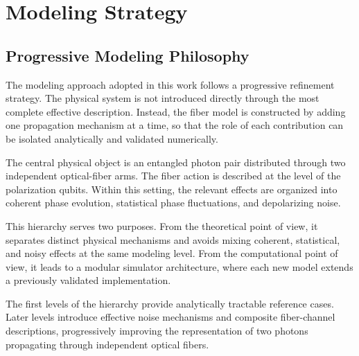 
\chapter{Modeling Strategy}


\section{Progressive Modeling Philosophy}

The modeling approach adopted in this work follows a progressive refinement strategy. The physical system is not introduced directly through the most complete effective description. Instead, the fiber model is constructed by adding one propagation mechanism at a time, so that the role of each contribution can be isolated analytically and validated numerically.

\medskip

The central physical object is an entangled photon pair distributed through two independent optical-fiber arms. The fiber action is described at the level of the polarization qubits. Within this setting, the relevant effects are organized into coherent phase evolution, statistical phase fluctuations, and depolarizing noise.

\medskip

This hierarchy serves two purposes. From the theoretical point of view, it separates distinct physical mechanisms and avoids mixing coherent, statistical, and noisy effects at the same modeling level. From the computational point of view, it leads to a modular simulator architecture, where each new model extends a previously validated implementation.

\medskip

The first levels of the hierarchy provide analytically tractable reference cases. Later levels introduce effective noise mechanisms and composite fiber-channel descriptions, progressively improving the representation of two photons propagating through independent optical fibers.


